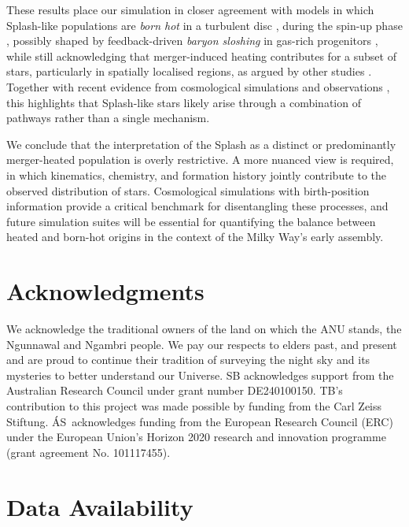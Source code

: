 \documentclass[fleqn,usenatbib]{mnras}
\begin{document}
These results place our simulation in closer agreement with models in which Splash-like populations are \emph{born hot} in a turbulent disc \citep[e.g.][]{Amarante2020}, during the spin-up phase \citep[e.g.][]{Yu2023}, possibly shaped by feedback-driven \textit{baryon sloshing} in gas-rich progenitors \citep{BlandHawthorn2025}, while still acknowledging that merger-induced heating contributes for a subset of stars, particularly in spatially localised regions, as argued by other studies \citep[e.g.][]{DiMatteo2019, Belokurov2020, Bonaca2020}. Together with recent evidence from cosmological simulations and observations \citep{Dillamore2022, Dillamore2023, Khoperskov2023, Dillamore2025, Kisku2025}, this highlights that Splash-like stars likely arise through a combination of pathways rather than a single mechanism.

We conclude that the interpretation of the Splash as a distinct or predominantly merger-heated population is overly restrictive. A more nuanced view is required, in which kinematics, chemistry, and formation history jointly contribute to the observed distribution of stars. Cosmological simulations with birth-position information provide a critical benchmark for disentangling these processes, and future simulation suites will be essential for quantifying the balance between heated and born-hot origins in the context of the Milky Way’s early assembly.

\section*{Acknowledgments}

We acknowledge the traditional owners of the land on which the ANU stands, the Ngunnawal and Ngambri people. We pay our respects to elders past, and present and are proud to continue their tradition of surveying the night sky and its mysteries to better understand our Universe. SB acknowledges support from the Australian Research Council under grant number DE240100150.
TB's contribution to this project was made possible by funding from the Carl Zeiss Stiftung. \'{A}S~acknowledges funding from the European Research Council (ERC) under the European Union’s Horizon 2020 research and innovation programme (grant agreement No. 101117455).

\section*{Data Availability}
\end{document}
